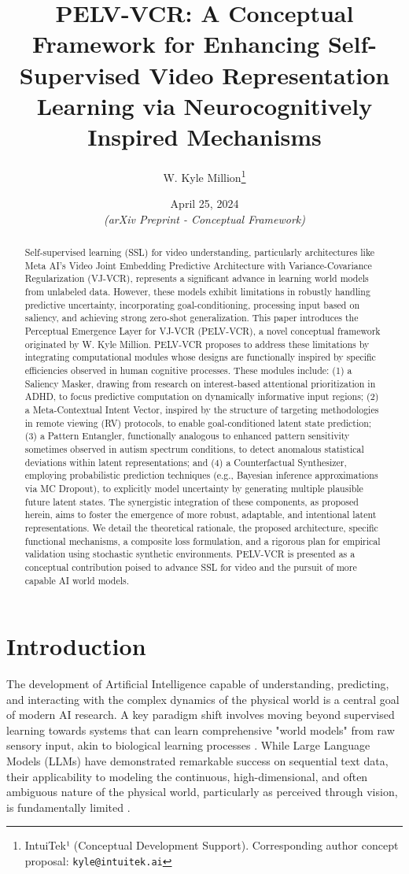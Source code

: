 \documentclass[11pt]{article}
\title{PELV-VCR: A Conceptual Framework for Enhancing Self-Supervised Video Representation Learning via Neurocognitively Inspired Mechanisms}
\author{W. Kyle Million\thanks{IntuiTek¹ (Conceptual Development Support). Corresponding author concept proposal: \texttt{kyle@intuitek.ai}}}
\date{April 25, 2024 \\ \textit{(arXiv Preprint - Conceptual Framework)}} %
\begin{document}
\maketitle

\begin{abstract}
Self-supervised learning (SSL) for video understanding, particularly architectures like Meta AI's Video Joint Embedding Predictive Architecture with Variance-Covariance Regularization (VJ-VCR), represents a significant advance in learning world models from unlabeled data. However, these models exhibit limitations in robustly handling predictive uncertainty, incorporating goal-conditioning, processing input based on saliency, and achieving strong zero-shot generalization. This paper introduces the Perceptual Emergence Layer for VJ-VCR (PELV-VCR), a novel conceptual framework originated by W. Kyle Million. PELV-VCR proposes to address these limitations by integrating computational modules whose designs are functionally inspired by specific efficiencies observed in human cognitive processes. These modules include: (1) a Saliency Masker, drawing from research on interest-based attentional prioritization in ADHD, to focus predictive computation on dynamically informative input regions; (2) a Meta-Contextual Intent Vector, inspired by the structure of targeting methodologies in remote viewing (RV) protocols, to enable goal-conditioned latent state prediction; (3) a Pattern Entangler, functionally analogous to enhanced pattern sensitivity sometimes observed in autism spectrum conditions, to detect anomalous statistical deviations within latent representations; and (4) a Counterfactual Synthesizer, employing probabilistic prediction techniques (e.g., Bayesian inference approximations via MC Dropout), to explicitly model uncertainty by generating multiple plausible future latent states. The synergistic integration of these components, as proposed herein, aims to foster the emergence of more robust, adaptable, and intentional latent representations. We detail the theoretical rationale, the proposed architecture, specific functional mechanisms, a composite loss formulation, and a rigorous plan for empirical validation using stochastic synthetic environments. PELV-VCR is presented as a conceptual contribution poised to advance SSL for video and the pursuit of more capable AI world models.
\end{abstract}

\section{Introduction}
The development of Artificial Intelligence capable of understanding, predicting, and interacting with the complex dynamics of the physical world is a central goal of modern AI research. A key paradigm shift involves moving beyond supervised learning towards systems that can learn comprehensive "world models" from raw sensory input, akin to biological learning processes \cite{LeCun2022}. While Large Language Models (LLMs) have demonstrated remarkable success on sequential text data, their applicability to modeling the continuous, high-dimensional, and often ambiguous nature of the physical world, particularly as perceived through vision, is fundamentally limited \cite{LeCun2025}.
\end{document}
